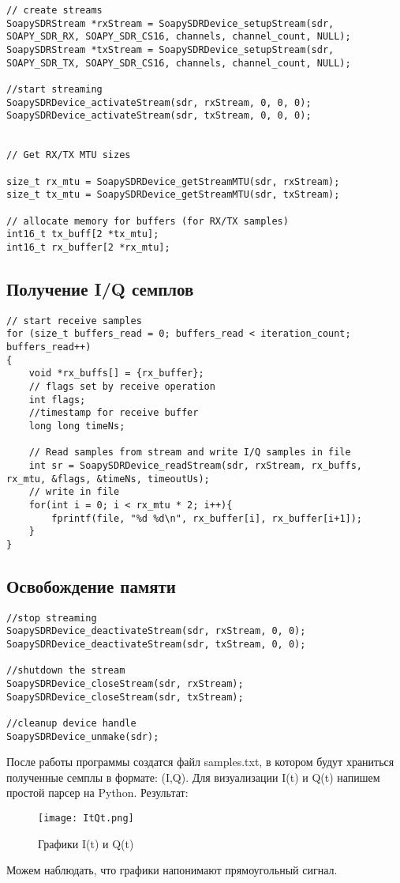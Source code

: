 \begin{lstlisting}
// create streams
SoapySDRStream *rxStream = SoapySDRDevice_setupStream(sdr, SOAPY_SDR_RX, SOAPY_SDR_CS16, channels, channel_count, NULL);
SoapySDRStream *txStream = SoapySDRDevice_setupStream(sdr, SOAPY_SDR_TX, SOAPY_SDR_CS16, channels, channel_count, NULL);

//start streaming
SoapySDRDevice_activateStream(sdr, rxStream, 0, 0, 0); 
SoapySDRDevice_activateStream(sdr, txStream, 0, 0, 0);


// Get RX/TX MTU sizes

size_t rx_mtu = SoapySDRDevice_getStreamMTU(sdr, rxStream);
size_t tx_mtu = SoapySDRDevice_getStreamMTU(sdr, txStream);

// allocate memory for buffers (for RX/TX samples)
int16_t tx_buff[2 *tx_mtu];
int16_t rx_buffer[2 *rx_mtu];
\end{lstlisting}


\subsection*{\textbf{Получение I/Q семплов}}

\begin{lstlisting}
// start receive samples
for (size_t buffers_read = 0; buffers_read < iteration_count; buffers_read++)
{
    void *rx_buffs[] = {rx_buffer};
    // flags set by receive operation
    int flags;    
    //timestamp for receive buffer   
    long long timeNs; 
    
    // Read samples from stream and write I/Q samples in file
    int sr = SoapySDRDevice_readStream(sdr, rxStream, rx_buffs, rx_mtu, &flags, &timeNs, timeoutUs);
    // write in file
    for(int i = 0; i < rx_mtu * 2; i++){
        fprintf(file, "%d %d\n", rx_buffer[i], rx_buffer[i+1]);
    }
}
\end{lstlisting}

\subsection*{\textbf{Освобождение памяти}}

\begin{lstlisting}
//stop streaming
SoapySDRDevice_deactivateStream(sdr, rxStream, 0, 0);
SoapySDRDevice_deactivateStream(sdr, txStream, 0, 0);

//shutdown the stream
SoapySDRDevice_closeStream(sdr, rxStream);
SoapySDRDevice_closeStream(sdr, txStream);

//cleanup device handle
SoapySDRDevice_unmake(sdr);
\end{lstlisting}

После работы программы создатся файл samples.txt, в котором будут храниться полученные семплы в формате: (I,Q). Для визуализации
I(t) и Q(t) напишем простой парсер на Python. Результат:

\begin{figure}[H]
    \centering
    \texttt{[image: ItQt.png]}
    \caption{Графики I(t) и Q(t)}
\end{figure}

Можем наблюдать, что графики напонимают прямоугольный сигнал.

\endinput
